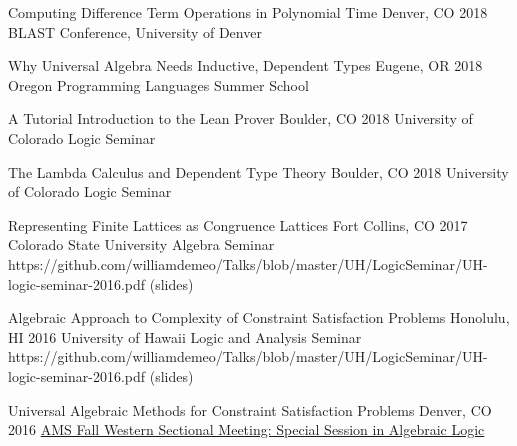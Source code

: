 \talk
    {Computing Difference Term Operations in Polynomial Time}
    {Denver, CO 2018}
    {BLAST Conference, University of Denver}

    \vspace{\vsp}
    
\talk %
    {Why Universal Algebra Needs Inductive, Dependent Types}
    {Eugene, OR 2018}
    {Oregon Programming Languages Summer School}

    \vspace{\vsp}

\talk %
    {A Tutorial Introduction to the Lean Prover}
    {Boulder, CO 2018}
    {University of Colorado Logic Seminar}

    \vspace{\vsp}

\talk
    {The Lambda Calculus and Dependent Type Theory} %
    {Boulder, CO 2018}
    {University of Colorado Logic Seminar}

    \vspace{\vsp}
\talkurl
    {Representing Finite Lattices as Congruence Lattices}
    {Fort Collins, CO 2017}
    {Colorado State University Algebra Seminar}
    {https://github.com/williamdemeo/Talks/blob/master/UH/LogicSeminar/UH-logic-seminar-2016.pdf}
    { (slides)}

    \vspace{\vsp}

\talkurl
    {Algebraic Approach to Complexity of Constraint Satisfaction Problems}
    {Honolulu, HI 2016}
    {University of Hawaii Logic and Analysis Seminar}
    {https://github.com/williamdemeo/Talks/blob/master/UH/LogicSeminar/UH-logic-seminar-2016.pdf}
    {(slides)}
    \vspace{\vsp}

\talk
    {Universal Algebraic Methods for Constraint Satisfaction Problems}
    {Denver, CO 2016}
    {\href{http://www.ams.org/meetings/sectional/2235_program_ss1.html}
      {AMS Fall Western Sectional Meeting: Special Session in Algebraic Logic}}
    

